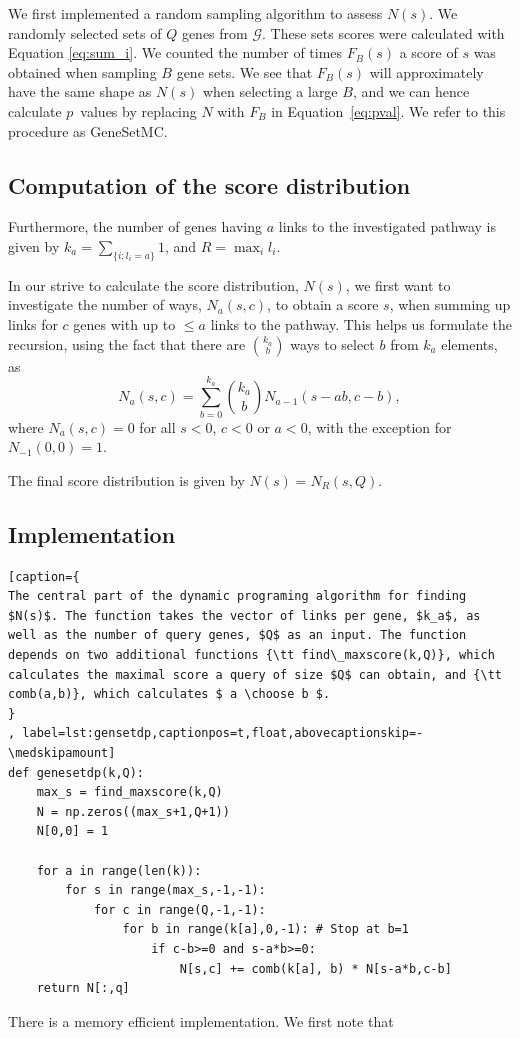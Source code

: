 \documentclass[a4paper,american]{lipics-v2016}
\begin{document}
We first implemented a random sampling algorithm to assess $N(s)$. We randomly selected sets of $Q$ genes from $\mathcal{G}$. These sets scores were calculated with Equation \ref{eq:sum_i}. We counted the number of times $F_B(s)$ a score of $s$ was obtained when sampling $B$ gene sets. We see that $F_B(s)$ will approximately have the same shape as $N(s)$ when selecting a large $B$, and we can hence calculate $p$~values by replacing $N$ with $F_B$ in Equation~\ref{eq:pval}. We refer to this procedure as GeneSetMC.

\subsection*{Computation of the score distribution}

Furthermore, the number of genes having $a$ links to the investigated pathway is given by $k_a=\sum_{\{i:l_i=a\}}1$, and $R=\max_{i}{l_i}$.

In our strive to calculate the score distribution, $N(s)$, we first want to investigate the number of ways, $N_a(s,c)$, to obtain a score $s$, when summing up links for $c$ genes with up to $\le a$ links to the pathway. This helps us formulate the recursion, using the fact that there are $k_a \choose b$ ways to select $b$ from $k_a$ elements, as
\begin{equation}
N_a(s,c)=\sum_{b=0}^{k_a}{k_a \choose b} N_{a-1}(s-ab,c-b),
\end{equation}
where $N_a(s,c)=0$ for all $s<0$, $c<0$ or $a<0$, with the exception for $N_{-1}(0,0)=1$.

The final score distribution is given by $N(s)=N_R(s,Q)$.

\subsection*{Implementation}

\begin{lstlisting}[caption={
The central part of the dynamic programing algorithm for finding $N(s)$. The function takes the vector of links per gene, $k_a$, as well as the number of query genes, $Q$ as an input. The function depends on two additional functions {\tt find\_maxscore(k,Q)}, which calculates the maximal score a query of size $Q$ can obtain, and {\tt comb(a,b)}, which calculates $ a \choose b $.
}
, label=lst:gensetdp,captionpos=t,float,abovecaptionskip=-\medskipamount]
def genesetdp(k,Q):
    max_s = find_maxscore(k,Q)
    N = np.zeros((max_s+1,Q+1))
    N[0,0] = 1

    for a in range(len(k)):
        for s in range(max_s,-1,-1):
            for c in range(Q,-1,-1):
                for b in range(k[a],0,-1): # Stop at b=1
                    if c-b>=0 and s-a*b>=0:
                        N[s,c] += comb(k[a], b) * N[s-a*b,c-b]
    return N[:,q]
\end{lstlisting}
There is a memory efficient implementation. We first note that
\end{document}
